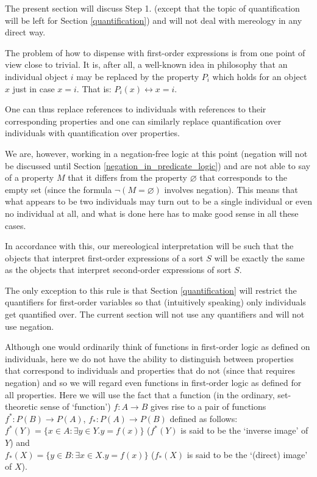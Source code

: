 \documentclass[12pt]{book}
\begin{document}
The present section will discuss Step 1. (except that the topic of quantification will be left for Section \ref{quantification}) and will not deal with mereology in any direct way.

The problem of how to dispense with first-order expressions is from one point of view close to trivial. It is, after all, a well-known idea in philosophy that an individual object $i$ may be replaced by the property $P_i$ which holds for an object $x$ just in case $x=i$. That is: $P_i(x) \leftrightarrow x=i$.

One can thus replace references to individuals with references to their corresponding properties and one can similarly replace quantification over individuals with quantification over properties.

We are, however, working in a negation-free logic at this point (negation will not be discussed until Section \ref{negation_in_predicate_logic}) and are not able to say of a property $M$ that it differs from the property $\varnothing$ that corresponds to the empty set (since the formula $\neg (M = \varnothing)$ involves negation). This means that what appears to be two individuals may turn out to be a single individual or even no individual at all, and what is done here has to make good sense in all these cases.

In accordance with this, our mereological interpretation will be such that the objects that interpret first-order expressions of a sort $S$ will be exactly the same as the objects that interpret second-order expressions of sort $S$.

The only exception to this rule is that Section \ref{quantification} will restrict the quantifiers for first-order variables so that (intuitively speaking) only individuals get quantified over. The current section will not use any quantifiers and will not use negation.

Although one would ordinarily think of functions in first-order logic as defined on individuals, here we do not have the ability to distinguish between properties that correspond to individuals and properties that do not (since that requires negation) and so we will regard even functions in first-order logic as defined for all properties. Here we will use the fact that a function (in the ordinary, set-theoretic sense of `function') $f:A \rightarrow B$ gives rise to a pair of functions $f^* : P(B) \rightarrow P(A)$, $f_* : P(A) \rightarrow P(B)$ defined as follows:\\
\indent $f^*(Y) = \{x \in A: \exists y \in Y.y = f(x)\}$ ($f^*(Y)$ is said to be the `inverse image' of $Y$) and\\
\indent $f_*(X) = \{y \in B: \exists x \in X.y = f(x)\}$ ($f_*(X)$ is said to be the `(direct) image' of $X$).
\end{document}
